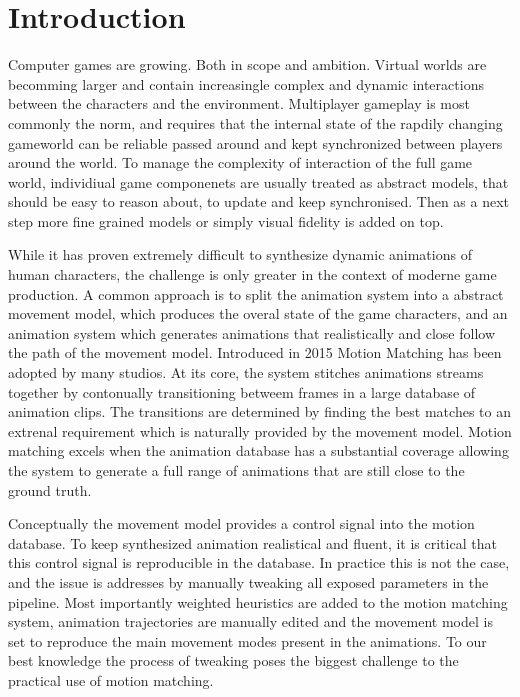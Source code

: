\section{Introduction}
Computer games are growing. Both in scope and ambition. Virtual worlds are becomming larger and contain increasingle complex and dynamic interactions between the characters and the environment. Multiplayer gameplay is most commonly the norm, and requires that the internal state of the rapdily changing gameworld can be reliable passed around and kept synchronized between players around the world. To manage the complexity of interaction of the full game world, individiual game componenets are usually treated as abstract models, that should be easy to reason about, to update and keep synchronised. Then as a next step more fine grained models or simply visual fidelity is added on top. 

While it has proven extremely difficult to synthesize dynamic animations of human characters, the challenge is only greater in the context of moderne game production. A common approach is to split the animation system into a abstract movement model, which produces the overal state of the game characters, and an animation system which generates animations that realistically and close follow the path of the movement model. Introduced in 2015 Motion Matching has been adopted by many studios. At its core, the system stitches animations streams together by contonually transitioning betweem frames in a large database of animation clips. The transitions are determined by finding the best matches to an extrenal requirement which is naturally provided by the movement model. Motion matching excels when the animation database has a substantial coverage allowing the system to generate a full range of animations that are still close to the ground truth. 

Conceptually the movement model provides a control signal into the motion database. To keep synthesized animation realistical and fluent, it is critical that this control signal is reproducible in the database. In practice this is not the case, and the issue is addresses by manually tweaking all exposed parameters in the pipeline. Most importantly weighted heuristics are added to the motion matching system, animation trajectories are manually edited and the movement model is set to reproduce the main movement modes present in the animations. To our best knowledge the process of tweaking poses the biggest challenge to the practical use of motion matching.  

